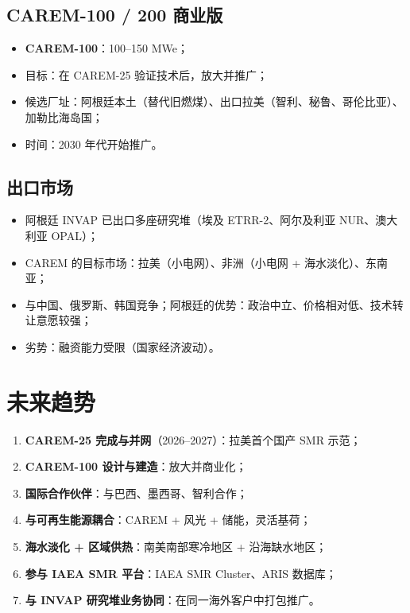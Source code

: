 \documentclass[
  UTF8,
  scheme=plain,
  fontsize=10pt,
  openany
]{ctexbook}
\begin{document}
\subsection{CAREM-100 / 200
商业版}\label{carem-100-200-ux5546ux4e1aux7248}

\begin{itemize}
\tightlist
\item
  \textbf{CAREM-100}：100--150 MWe；
\item
  目标：在 CAREM-25 验证技术后，放大并推广；
\item
  候选厂址：阿根廷本土（替代旧燃煤）、出口拉美（智利、秘鲁、哥伦比亚）、加勒比海岛国；
\item
  时间：2030 年代开始推广。
\end{itemize}

\subsection{出口市场}\label{ux51faux53e3ux5e02ux573a}

\begin{itemize}
\tightlist
\item
  阿根廷 INVAP 已出口多座研究堆（埃及 ETRR-2、阿尔及利亚 NUR、澳大利亚
  OPAL）；
\item
  CAREM 的目标市场：拉美（小电网）、非洲（小电网 + 海水淡化）、东南亚；
\item
  与中国、俄罗斯、韩国竞争；阿根廷的优势：政治中立、价格相对低、技术转让意愿较强；
\item
  劣势：融资能力受限（国家经济波动）。
\end{itemize}

\section{未来趋势}\label{ux672aux6765ux8d8bux52bf-1}

\begin{enumerate}
\def\labelenumi{\arabic{enumi}.}
\tightlist
\item
  \textbf{CAREM-25 完成与并网}（2026--2027）：拉美首个国产 SMR 示范；
\item
  \textbf{CAREM-100 设计与建造}：放大并商业化；
\item
  \textbf{国际合作伙伴}：与巴西、墨西哥、智利合作；
\item
  \textbf{与可再生能源耦合}：CAREM + 风光 + 储能，灵活基荷；
\item
  \textbf{海水淡化 + 区域供热}：南美南部寒冷地区 + 沿海缺水地区；
\item
  \textbf{参与 IAEA SMR 平台}：IAEA SMR Cluster、ARIS 数据库；
\item
  \textbf{与 INVAP 研究堆业务协同}：在同一海外客户中打包推广。
\end{enumerate}
\end{document}

